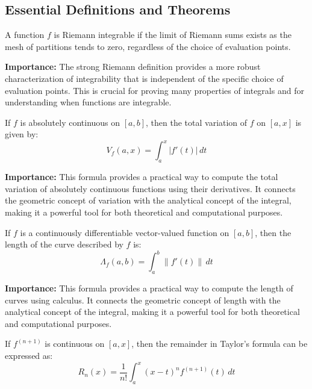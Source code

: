 \subsection*{Essential Definitions and Theorems}



\begin{definition}
A function $f$ is Riemann integrable if the limit of Riemann sums exists as the mesh of partitions tends to zero, regardless of the choice of evaluation points.
\end{definition}

\noindent\textbf{Importance:} The strong Riemann definition provides a more robust characterization of integrability that is independent of the specific choice of evaluation points. This is crucial for proving many properties of integrals and for understanding when functions are integrable.





\begin{theorem}
If $f$ is absolutely continuous on $[a, b]$, then the total variation of $f$ on $[a, x]$ is given by:
\[V_f(a, x) = \int_a^x |f'(t)| \, dt\]
\end{theorem}

\noindent\textbf{Importance:} This formula provides a practical way to compute the total variation of absolutely continuous functions using their derivatives. It connects the geometric concept of variation with the analytical concept of the integral, making it a powerful tool for both theoretical and computational purposes.



\begin{theorem}
If $f$ is a continuously differentiable vector-valued function on $[a, b]$, then the length of the curve described by $f$ is:
\[\Lambda_f(a, b) = \int_a^b \|f'(t)\| \, dt\]
\end{theorem}

\noindent\textbf{Importance:} This formula provides a practical way to compute the length of curves using calculus. It connects the geometric concept of length with the analytical concept of the integral, making it a powerful tool for both theoretical and computational purposes.



\begin{theorem}
If $f^{(n+1)}$ is continuous on $[a, x]$, then the remainder in Taylor's formula can be expressed as:
\[R_n(x) = \frac{1}{n!} \int_a^x (x - t)^n f^{(n+1)}(t) \, dt\]
\end{theorem}

